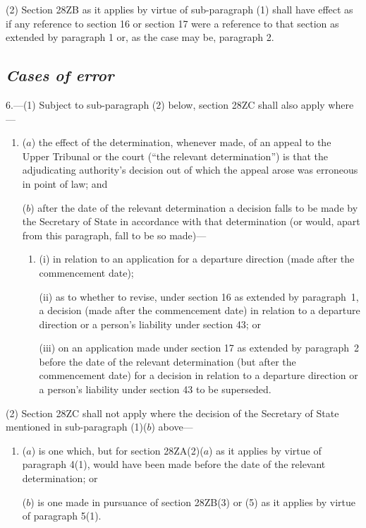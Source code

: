 \documentclass[12pt,a4paper]{article}
\begin{document}
(2) Section 28ZB as it applies by virtue of sub-paragraph (1) shall have effect as if any reference to section 16 or section 17 were a reference to that section as extended by paragraph 1 or, as the case may be, paragraph 2.


\subsection*{\itshape Cases of error}

6.---(1) Subject to sub-paragraph (2) below, section 28ZC shall also apply where—
\begin{enumerate}\item[]
($a$) the effect of the determination, whenever made, of an appeal to 
the Upper Tribunal  %
or the court (“the relevant determination”) is that the adjudicating authority’s decision out of which the appeal arose was erroneous in point of law; and

($b$) after the date of the relevant determination a decision falls to be made by the Secretary of State in accordance with that determination (or would, apart from this paragraph, fall to be so made)—
\begin{enumerate}\item[]
(i) in relation to an application for a departure direction (made after the commencement date);

(ii) as to whether to revise, under section 16 as extended by paragraph~1, a decision (made after the commencement date) in relation to a departure direction
or a person’s liability under section 43; or

(iii) on an application made under section 17 as extended by paragraph~2 before the date of the relevant determination (but after the commencement date) for a decision in relation to a departure direction
or a person’s liability under section 43 to be superseded.
\end{enumerate}
\end{enumerate}

(2) Section 28ZC shall not apply where the decision of the Secretary of State mentioned in sub-paragraph (1)($b$) above—
\begin{enumerate}\item[]
($a$) is one which, but for section 28ZA(2)($a$) as it applies by virtue of paragraph 4(1), would have been made before the date of the relevant determination; or

($b$) is one made in pursuance of section 28ZB(3) or (5) as it applies by virtue of paragraph 5(1).
\end{enumerate}
\end{document}
